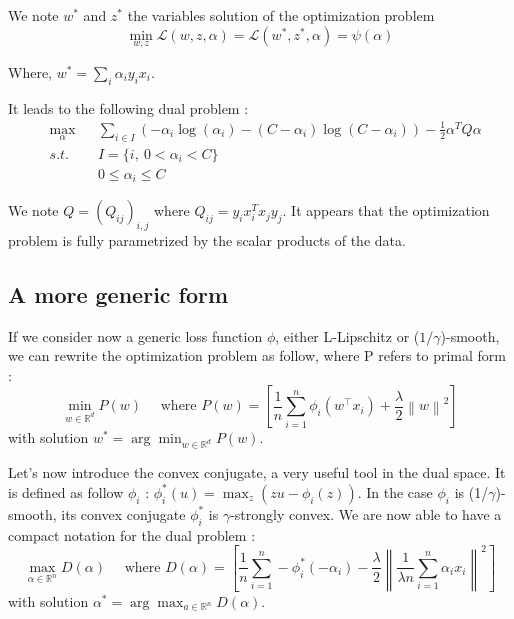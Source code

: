 \documentclass{article}
\newcommand{\norm}[1]{\left\|#1 \right\|}
\begin{document}
We note $w^*$ and $z^*$ the variables solution of the optimization problem
\begin{equation}
	\min_{w, z} \mathcal{L}(w, z, \alpha) = \mathcal{L}(w^*, z^*, \alpha) = \psi(\alpha) 
\end{equation}

Where, $w^* = \sum_i \alpha_i y_i x_i$.

It leads to the following dual problem :
\begin{equation}
	\begin{aligned}
		& \max_{\alpha} & &\sum_{i \in I} (-\alpha_i \log(\alpha_i) - (C-\alpha_i) \log(C - \alpha_i)) - \frac{1}{2} \alpha^TQ\alpha\\
		& s.t.          & &I = \{i,\ 0 < \alpha_i < C \}\\
		&               & &0 \leq \alpha_i \leq C
	\end{aligned}
\end{equation}

We note $Q = (Q_{ij})_{i,j}$ where $Q_{ij} = y_i x_i^T x_j y_j$. It appears that the optimization problem is fully parametrized by the scalar products of the data.

\subsection{A more generic form}

If we consider now a generic loss function $\phi$, either L-Lipschitz or ($1/\gamma$)-smooth, we can rewrite the optimization problem as follow, where P refers to primal form :
\begin{equation}
    \min_{w \in \mathbb{R}^d} P(w) \quad \text{ where } P(w) = \left[ \dfrac{1}{n} \sum_{i=1}^n \phi_i(w^\top x_i) + \dfrac{\lambda}{2}\norm{w}^2 \right]
    \label{primal}
\end{equation}
with solution $w^{*} = \arg \min_{w \in \mathbb{R}^d} P(w)$.

Let's now introduce the convex conjugate, a very useful tool in the dual space. It is defined as follow $\phi_i$ : $\phi_i^{*}(u) = \max_z (zu-\phi_i(z))$. In the case $\phi_i$ is (1/$\gamma$)-smooth, its convex conjugate $\phi_i^*$ is $\gamma$-strongly convex. We are now able to have a compact notation for the dual problem :
\begin{equation}
    \max_{\alpha \in \mathbb{R}^n} D(\alpha) \quad \text{ where } D(\alpha) = \left[ \dfrac{1}{n} \sum_{i=1}^n -\phi_i^{*}(-\alpha_i) - \dfrac{\lambda}{2}\norm{\dfrac{1}{\lambda n}\sum_{i=1}^n \alpha_ix_i}^2 \right]
    \label{dual}
\end{equation}
with solution $\alpha^{*} = \arg \max_{a \in \mathbb{R}^n} D(\alpha)$.
\end{document}

